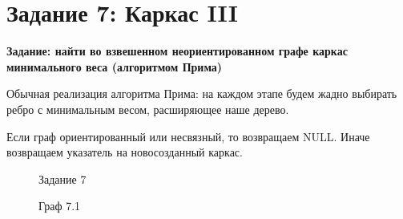\documentclass[otchet]{SCWorks}
\begin{document}
\section{Задание 7: Каркас III}

\textbf{Задание: найти во взвешенном неориентированном графе каркас минимального веса (алгоритмом Прима)}

Обычная реализация алгоритма Прима: на каждом этапе будем жадно выбирать ребро с минимальным весом, расширяющее наше дерево.

Если граф ориентированный или несвязный, то возвращаем NULL. Иначе возвращаем указатель на новосозданный каркас.

\begin{figure}[H]
	\caption{Задание 7}
	\label{pic7_1}
\end{figure}

\begin{figure}[H]
	\caption{Граф 7.1}
	\label{gr7_1}
\end{figure}
\end{document}
